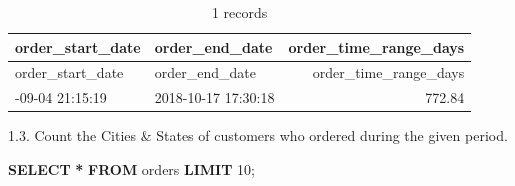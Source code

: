 \documentclass[
]{article}
\newenvironment{Shaded}{\begin{snugshade}}{\end{snugshade}}
\newcommand{\DecValTok}[1]{\textcolor[rgb]{0.00,0.00,0.81}{#1}}
\newcommand{\KeywordTok}[1]{\textcolor[rgb]{0.13,0.29,0.53}{\textbf{#1}}}
\newcommand{\NormalTok}[1]{#1}
\newcommand{\OperatorTok}[1]{\textcolor[rgb]{0.81,0.36,0.00}{\textbf{#1}}}
\begin{document}
\begin{longtable}[]{@{}llr@{}}
\caption{1 records}\tabularnewline
\toprule\noalign{}
order\_start\_date & order\_end\_date & order\_time\_range\_days \\
\midrule\noalign{}
\endfirsthead
\toprule\noalign{}
order\_start\_date & order\_end\_date & order\_time\_range\_days \\
\midrule\noalign{}
\endhead
\bottomrule\noalign{}
\endlastfoot
2016-09-04 21:15:19 & 2018-10-17 17:30:18 & 772.84 \\
\end{longtable}

1.3. Count the Cities \& States of customers who ordered during the
given period.

\begin{Shaded}
\begin{Highlighting}[]
\KeywordTok{SELECT} \OperatorTok{*} \KeywordTok{FROM}\NormalTok{ orders }\KeywordTok{LIMIT} \DecValTok{10}\NormalTok{;}
\end{Highlighting}
\end{Shaded}
\end{document}
